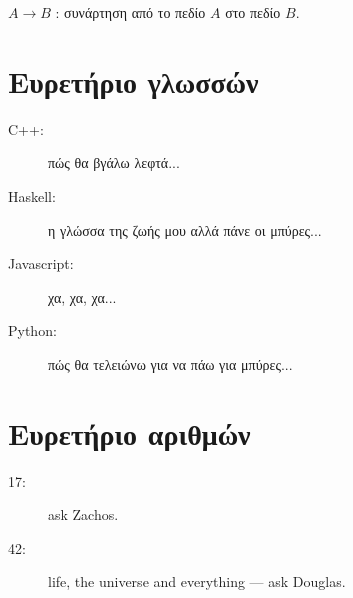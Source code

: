 \documentclass[diploma]{softlab-thesis}
\begin{document}
$A \rightarrow B$ : συνάρτηση από το πεδίο $A$ στο πεδίο $B$.

\chapter{Ευρετήριο γλωσσών}

\begin{description}
\item[C++:] πώς θα βγάλω λεφτά...
\item[Haskell:] η γλώσσα της ζωής μου αλλά πάνε οι μπύρες...
\item[Javascript:] χα, χα, χα...
\item[Python:] πώς θα τελειώνω για να πάω για μπύρες...
\end{description}


\chapter{Ευρετήριο αριθμών}

\begin{description}
\item[17:] ask Zachos.
\item[42:] life, the universe and everything --- ask Douglas.
\end{description}


\end{document}
